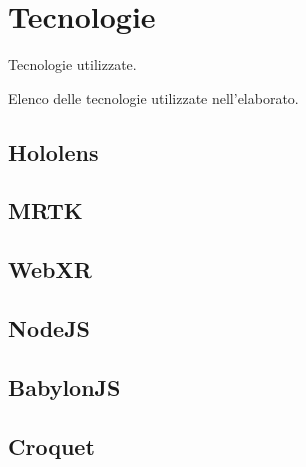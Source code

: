 \chapter{Tecnologie}\label{chap:Tecnologie}
Tecnologie utilizzate.

Elenco delle tecnologie utilizzate nell'elaborato.
\section{Hololens}\label{ssec:Hololens}
\section{MRTK}\label{ssec:MRTK}
\section{WebXR}\label{ssec:WebXR}
\section{NodeJS}\label{ssec:NodeJS}
\section{BabylonJS}\label{ssec:BabylonJS}
\section{Croquet}\label{ssec:Croquet}

\newpage